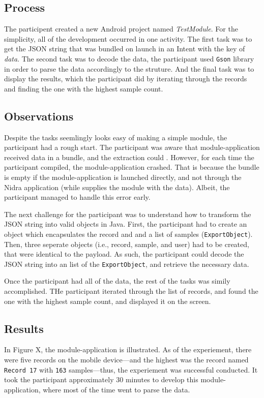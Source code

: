 \subsection{Process}

The participent created a new Android project named \textit{TestModule}. For the simplicity, all of the development occurred in one activity. The first task was to get the JSON string that was bundled on launch in an Intent with the key of \textit{data}. The second task was to decode the data, the participant used  \verb|Gson| library in order to parse the data accordingly to the struture. And the final task was to display the results, which the participant did by iterating through the records and finding the one with the highest sample count.

\subsection{Observations}
Despite the tasks seemlingly looks easy of making a simple module, the participant had a rough start. The participant was aware that module-application received data in a bundle, and the extraction could . However, for each time the participant compiled, the module-application crashed. That is because the bundle is empty if the module-application is launched directly, and not through the Nidra application (while supplies the module with the data). Albeit, the participant managed to handle this error early. 

The next challenge for the participant was to understand how to transform the JSON string into valid objects in Java. First, the participant had to create an object which encapsulates the record and and a list of samples (\verb|ExportObject|). Then, three seperate objects (i.e., record, sample, and user) had to be created, that were identical to the payload. As such, the participant could decode the JSON string into an list of the \verb|ExportObject|, and retrieve the necessary data.

Once the participant had all of the data, the rest of the tasks was simily accomplished. THe participant iterated through the list of records, and found the one with the highest sample count, and displayed it on the screen. 

\subsection{Results}

In Figure X, the module-application is illustrated. As of the experiement, there were five records on the mobile device---and the highest was the record named \verb|Record 17| with \verb|163| samples---thus, the experiement was successful conducted. It took the participant approximately 30 minutes to develop this module-application, where most of the time went to parse the data.

